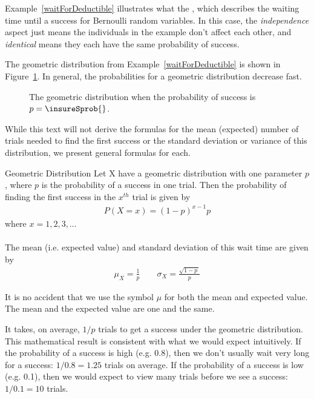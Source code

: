 Example~\ref{waitForDeductible} illustrates what the
,
which describes the waiting
time until a success for
Bernoulli random variables.
In this case, the \emph{independence} aspect just means
the individuals in the example don't affect each other,
and \emph{identical} means they each have the same probability
of success.

The geometric distribution from Example~\ref{waitForDeductible} is shown in Figure~\ref{geometricDist70}. In general, the probabilities for a geometric distribution decrease  fast.

\begin{figure}[h]
  \centering
  \caption{The geometric distribution when the probability
      of success is $p = \insureSprob{}$.}
  \label{geometricDist70}
\end{figure}

While this text will not derive the formulas for the mean (expected) number of trials needed to find the first success or the standard deviation or variance of this distribution, we present general formulas for each.

\begin{onebox}{Geometric Distribution}
  Let X have a geometric distribution with one parameter $p$, where $p$ is the probability of a success in one trial.   Then the
  probability of finding the first success in the
  $x^{th}$ trial is given by\vspace{-1.5mm}
  \begin{align*}
  P(X = x) = (1-p)^{x-1}p
  \end{align*}
where $x=1,2,3,\dots$\\
\\
  The mean (i.e. expected value) and standard deviation of this wait time are given by
  \begin{align*}
  \mu_{\scriptscriptstyle{X}} = \frac{1}{p}
      \qquad \sigma_{\scriptscriptstyle{X}} = \frac{\sqrt{1-p\ }}{p}
  \end{align*}
\end{onebox}

It is no accident that we use the symbol $\mu$ for both the mean and expected value. The mean and the expected value are one and the same.

It takes, on average, $1/p$ trials to get a success under the geometric distribution. This mathematical result is consistent with what we would expect intuitively. If the probability of a success is high (e.g. 0.8), then we don't usually wait very long for a success: $1/0.8 = 1.25$ trials on average. If the probability of a success is low (e.g. 0.1), then we would expect to view many trials before we see a success: $1/0.1 = 10$ trials.

